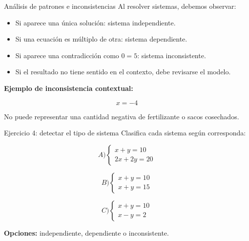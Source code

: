 \documentclass{beamer}
\begin{document}
	\begin{frame}{Análisis de patrones e inconsistencias}
		Al resolver sistemas, debemos observar:
		
		\begin{itemize}
			\item Si aparece una única solución: sistema independiente.
			\item Si una ecuación es múltiplo de otra: sistema dependiente.
			\item Si aparece una contradicción como $0=5$: sistema inconsistente.
			\item Si el resultado no tiene sentido en el contexto, debe revisarse el modelo.
		\end{itemize}
		
		\bigskip
		
		\textbf{Ejemplo de inconsistencia contextual:}
		
		\[
		x=-4
		\]
		
		No puede representar una cantidad negativa de fertilizante o sacos cosechados.
	\end{frame}
	
	\begin{frame}{Ejercicio 4: detectar el tipo de sistema}
		Clasifica cada sistema según corresponda:
		
		\[
		A)
		\begin{cases}
			x+y=10 \\
			2x+2y=20
		\end{cases}
		\]
		
		\[
		B)
		\begin{cases}
			x+y=10 \\
			x+y=15
		\end{cases}
		\]
		
		\[
		C)
		\begin{cases}
			x+y=10 \\
			x-y=2
		\end{cases}
		\]
		
		\bigskip
		
		\textbf{Opciones:} independiente, dependiente o inconsistente.
	\end{frame}
	
\end{document}
